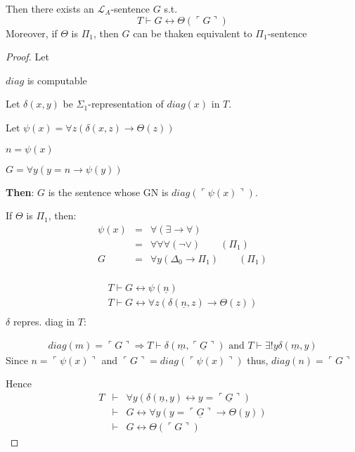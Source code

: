 \documentclass[12pt]{article}
\newcommand{\proves}{\vdash}
\newcommand{\gn}[1]{\ulcorner #1 \urcorner}
\begin{document}
Then there exists an $\mathcal{L}_A$-sentence $G$ s.t.
\[
T \proves G \leftrightarrow \Theta(\gn{G})
\]
Moreover, if $\Theta$ is $\Pi_1$, then $G$ can be thaken equivalent to $\Pi_1$-sentence
\begin{proof}
  Let 
  \iffalse %
  \[
  diag(n) =
  \begin{cases}
   \gn{\forall y ( y=n \rigtarrow \sigma(y))} %
   &\text{if $n = \gn{\sigma(x)}$ for some $\mathcal{L}_A$ formula $\sigma$} \\
   0 &\text{ o.w.}
  \end{cases}
  \]
  \fi
  $diag$ is computable

  Let $\delta(x,y)$ be $\Sigma_1$-representation of $diag(x)$ in $T$.

  Let $\psi(x) = \forall z \left( \delta(x,z) \rightarrow \Theta(z) \right)$

  $n = \psi(x)$

  $G = \forall y \left( y = n \rightarrow \psi(y) \right)$ %

  \textbf{Then}: $G$ is the sentence whose GN is $diag(\gn{\psi(x)})$.

  If $\Theta$ is $\Pi_1$, then:
  \begin{align*}
    \psi(x) &=& \forall ( \exists \rightarrow \forall) \\
            &=& \forall \forall \forall (\neg \vee) \qquad (\Pi_1) \\
            G &=&  \forall y ( \Delta_0 \rightarrow \Pi_1) \qquad (\Pi_1) \\
  \end{align*}

\begin{align}
  \label{eq:star}
  T \proves G \leftrightarrow \psi(\underline{n}) \\
  T \proves G \leftrightarrow \forall z (\delta(\underline{n}, z) \rightarrow \Theta(z)) \\
\end{align}
$\delta$ repres. diag in $T$:

\begin{align*}
  diag(m) = 
  \gn{G} \Rightarrow T \proves \delta(\underline{m}, \underline{\gn{G}})
  \text{ and } T \proves \exists !y \delta(\underline{m},y)
\end{align*}
Since $n = \gn{\psi(x)}$ and $\gn{G} = diag(\gn{\psi(x)})$
thus, $diag(n) = \gn{G}$

Hence 
\begin{align*}
  T &\proves& \forall y \left( \delta(\underline{n}, y) \leftrightarrow
  y = \underline{\gn{G}} \right) \\
  &\proves& G \leftrightarrow \forall y (y = \underline{\gn{G}} \rightarrow \Theta(y)) \\
  &\proves& G \leftrightarrow \Theta(\gn{G})
\end{align*}
\end{proof}
\end{document}
